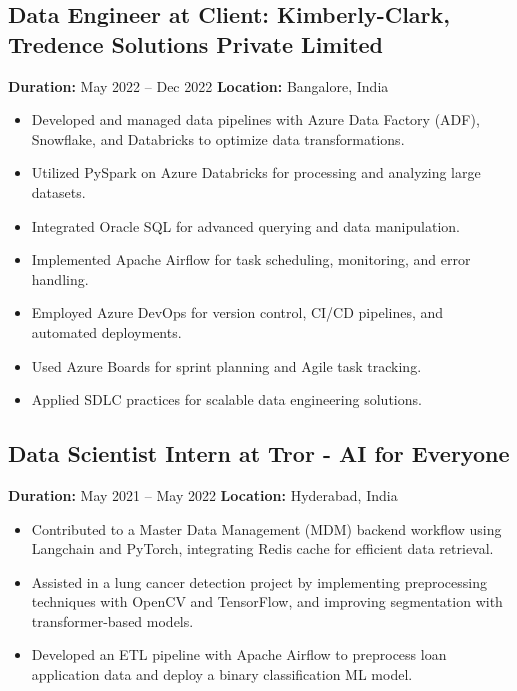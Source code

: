 \documentclass[10pt]{article}
\begin{document}
\par
\subsection*{Data Engineer at Client: Kimberly-Clark, Tredence Solutions Private Limited}
\textbf{Duration:} May 2022 -- Dec 2022\quad
\textbf{Location:} Bangalore, India\\

\begin{itemize}
  \item Developed and managed data pipelines with Azure Data Factory (ADF), Snowflake, and Databricks to optimize data transformations.
  \item Utilized PySpark on Azure Databricks for processing and analyzing large datasets.
  \item Integrated Oracle SQL for advanced querying and data manipulation.
  \item Implemented Apache Airflow for task scheduling, monitoring, and error handling.
  \item Employed Azure DevOps for version control, CI/CD pipelines, and automated deployments.
  \item Used Azure Boards for sprint planning and Agile task tracking.
  \item Applied SDLC practices for scalable data engineering solutions.
\end{itemize}
\par
\subsection*{Data Scientist Intern at Tror - AI for Everyone}
\textbf{Duration:} May 2021 -- May 2022\quad
\textbf{Location:} Hyderabad, India\\

\begin{itemize}
  \item Contributed to a Master Data Management (MDM) backend workflow using Langchain and PyTorch, integrating Redis cache for efficient data retrieval.
  \item Assisted in a lung cancer detection project by implementing preprocessing techniques with OpenCV and TensorFlow, and improving segmentation with transformer-based models.
  \item Developed an ETL pipeline with Apache Airflow to preprocess loan application data and deploy a binary classification ML model.
\end{itemize}
\par
\end{document}
